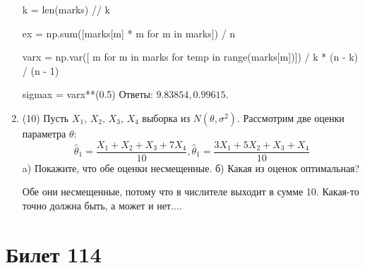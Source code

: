 \documentclass[a4paper,12pt]{article}
\begin{document}
\begin{enumerate}
    


    k = len(marks) // k

    ex = np.sum([marks[m] * m for m in marks]) / n

    varx = np.var([ m for m in marks for temp in range(marks[m])]) / k * (n - k) / (n - 1)

    sigmax = varx**(0.5)
    Ответы: $9.83854, 0.99615$.

    

\item


(10) Пусть $X _{1}$, $X _{2}$, $X _{3}$, $X _{4}$ выборка из $N(\theta, \sigma ^{2})$. Рассмотрим две оценки параметра $\theta$:
\[\hat \theta _{1} = \frac{X _{1} + X _{2} + X _{3} + 7X _{4}}{10}, \hat \theta _{1} = \frac{3X _{1} + 5X _{2} + X _{3} + X _{4}}{10}\]
a) Покажите, что обе оценки несмещенные.
б) Какая из оценок оптимальная?




Обе они несмещенные, потому что в числителе выходит в сумме 10.
Какая-то точно должна быть, а может и нет....



\end{enumerate}

\section{Билет 114}
\end{document}
